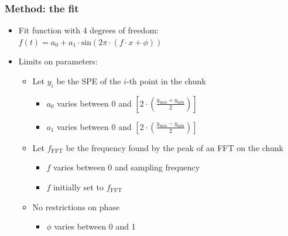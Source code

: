 \documentclass[bigger]{beamer}
\begin{document}
\begin{frame}
\frametitle{Method: the fit}
\label{sec-2-1-2}
\begin{itemize}

\item Fit function with 4 degrees of freedom:\\
\label{sec-2-1-2-1}%
\(f(t) = a_{0} + a_{1} \cdot \text{sin}(2\pi \cdot (f\cdot x + \phi))\)

\item Limits on parameters:
\label{sec-2-1-2-2}%
\begin{itemize}

\item Let $y_{i}$ be the SPE of the $i$-th point in the chunk
\label{sec-2-1-2-2-1}%
\begin{itemize}

\item $a_{0}$ varies between 0 and \(\left[2 \cdot \left(\frac{y_{\text{max}} + y_{\text{min}}}{2}\right)\right] \)
\label{sec-2-1-2-2-1-1}%

\item $a_{1}$ varies between 0 and \(\left[2 \cdot \left(\frac{y_{\text{max}} - y_{\text{min}}}{2}\right)\right] \)
\label{sec-2-1-2-2-1-2}%
\end{itemize} %

\item Let $f_{\text{FFT}}$ be the frequency found by the peak of an FFT on the chunk
\label{sec-2-1-2-2-2}%
\begin{itemize}

\item $f$ varies between 0 and sampling frequency
\label{sec-2-1-2-2-2-1}%

\item $f$ initially set to $f_{\text{FFT}}$
\label{sec-2-1-2-2-2-2}%
\end{itemize} %

\item No restrictions on phase
\label{sec-2-1-2-2-3}%
\begin{itemize}

\item $\phi$ varies between 0 and 1
\label{sec-2-1-2-2-3-1}%
\end{itemize} %
\end{itemize} %
\end{itemize} %
\end{frame}
\end{document}
